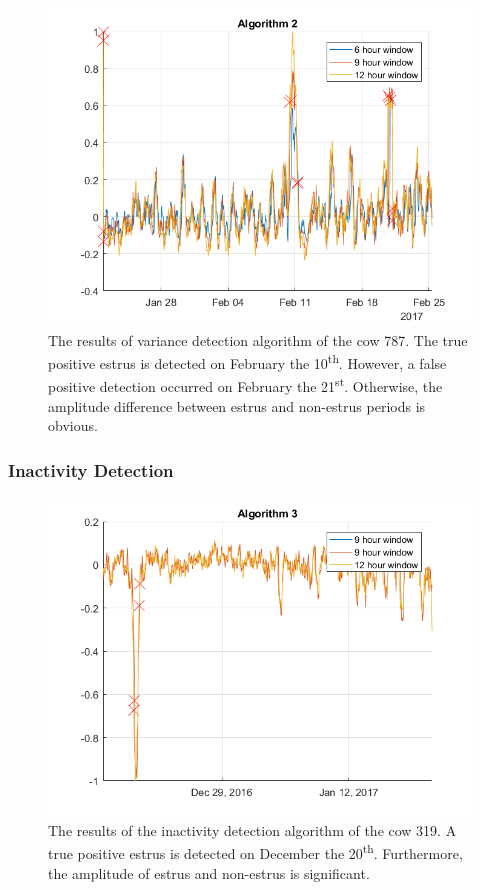 \documentclass[english,12pt,a4paper,pdftex,elec,utf8]{aaltothesis}
\begin{document}
\begin{figure}[htb]
\centering
\includegraphics[width = 0.75 \textwidth]{figures/algorithm2_cow787}
\caption{The results of variance detection algorithm of the cow 787. The true positive estrus is detected on February the 10\textsuperscript{th}. However, a false positive detection occurred on February the 21\textsuperscript{st}. Otherwise, the amplitude  difference between estrus and non-estrus periods is obvious.}
\end{figure}



\subsubsection{Inactivity Detection} \label{inactivitydetectionevaluation}



\begin{figure}[htb]
\centering
\includegraphics[width = 0.75 \textwidth]{figures/algorithm3_cow319.png}
\caption{The results of the inactivity detection algorithm of the cow 319. A true positive estrus is detected on December the 20\textsuperscript{th}. Furthermore, the amplitude of estrus and non-estrus is significant. }
\end{figure}
\end{document}
